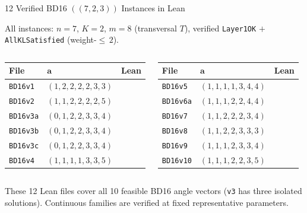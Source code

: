 \documentclass[aspectratio=169,t,10pt]{beamer}
\newcommand{\code}[1]{\texttt{\small #1}}
\newcommand{\chk}{\textcolor{Sage}{\checkmark}}
\begin{document}
\begin{frame}{12 Verified BD16 $((7,2,3))$ Instances in Lean}

All instances: $n{=}7$, $K{=}2$, $m{=}8$ (transversal $T$),
verified \code{Layer1OK} $+$ \code{AllKLSatisfied} (weight-${\leq}\,2$).

\vspace{0.2em}
\begin{columns}[T]
\begin{center}
{\scriptsize
\begin{tabular}{@{}lll@{}}
\toprule
\textbf{File} & \textbf{$\mathbf{a}$} & \textbf{Lean} \\
\midrule
\code{BD16v1}  & $(1,2,2,2,2,3,3)$ & \chk \\
\code{BD16v2}  & $(1,1,2,2,2,2,5)$ & \chk \\
\code{BD16v3a} & $(0,1,2,2,3,3,4)$ & \chk \\
\code{BD16v3b} & $(0,1,2,2,3,3,4)$ & \chk \\
\code{BD16v3c} & $(0,1,2,2,3,3,4)$ & \chk \\
\code{BD16v4}  & $(1,1,1,1,3,3,5)$ & \chk \\
\bottomrule
\end{tabular}
}
\end{center}

\begin{center}
{\scriptsize
\begin{tabular}{@{}lll@{}}
\toprule
\textbf{File} & \textbf{$\mathbf{a}$} & \textbf{Lean} \\
\midrule
\code{BD16v5}   & $(1,1,1,1,3,4,4)$ & \chk \\
\code{BD16v6a}  & $(1,1,1,2,2,4,4)$ & \chk \\
\code{BD16v7}   & $(1,1,2,2,2,3,4)$ & \chk \\
\code{BD16v8}   & $(1,1,2,2,3,3,3)$ & \chk \\
\code{BD16v9}   & $(1,1,1,2,3,3,4)$ & \chk \\
\code{BD16v10}  & $(1,1,1,2,2,3,5)$ & \chk \\
\bottomrule
\end{tabular}
}
\end{center}
\end{columns}

\vspace{-0.3em}
\textcolor{Slate}{\small
These 12 Lean files cover all 10 feasible BD16 angle vectors
(\code{v3} has three isolated solutions). Continuous families are verified at fixed representative parameters.
}
\end{frame}
\end{document}
